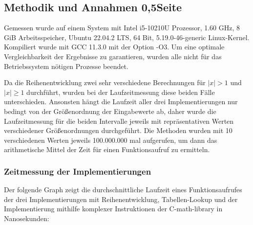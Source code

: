 \documentclass[course=erap] {aspdoc}
\begin{document}
    \subsection{Methodik und Annahmen 0,5Seite}

    Gemessen wurde auf einem System mit Intel i5-10210U Prozessor, 1.60 GHz, 8 GiB Arbeitsspeicher, Ubuntu 22.04.2 LTS, 64 Bit, 5.19.0-46-generic Linux-Kernel.
    Kompiliert wurde mit GCC 11.3.0 mit der Option -O3. Um eine optimale Vergleichbarkeit der Ergebnisse zu garantieren, wurden alle nicht für das Betriebssystem nötigen Prozesse beendet.

    Da die Reihenentwicklung zwei sehr verschiedene Berechnungen für $|x|>1$ und $|x|\geq 1$ durchführt, wurden bei der Laufzeitmessung diese beiden Fälle unterschieden.
    Ansonsten hängt die Laufzeit aller drei Implementierungen nur bedingt von der Größenordnung der Eingabewerte ab, daher wurde die Laufzeitmessung für die beiden Intervalle jeweils mit repräsentativen Werten verschiedener Größenordnungen durchgeführt.
    Die Methoden wurden mit 10 verschiedenen Werten jeweils 100.000.000 mal aufgerufen, um dann das arithmetische Mittel der Zeit für einen Funktionsaufruf zu ermitteln.

    \subsubsection{Zeitmessung der Implementierungen}

    Der folgende Graph zeigt die durchschnittliche Laufzeit eines Funktionsaufrufes der drei Implementierungen mit Reihenentwicklung, Tabellen-Lookup und der Implementierung mithilfe komplexer Instruktionen der C-math-library in Nanosekunden:

 
\end{document}
